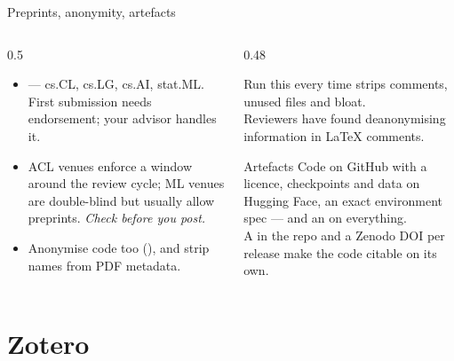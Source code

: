 \documentclass[aspectratio=169,11pt]{beamer}
\begin{document}
\begin{frame}{Preprints, anonymity, artefacts}
\begin{columns}[T]
\begin{column}{0.5\textwidth}
\begin{itemize}
  \item {} --- cs.CL, cs.LG, cs.AI, stat.ML. First submission needs
        endorsement; your advisor handles it.
  \item {} ACL venues enforce a window around the review cycle;
        ML venues are double-blind but usually allow preprints. \emph{Check
        before you post.}
  \item Anonymise code too
        (), and
        strip names from PDF metadata.
\end{itemize}
\end{column}
\begin{column}{0.48\textwidth}
\begin{block}{Run this every time}
\footnotesize
{}
strips comments, unused files and bloat.\\[3pt]
Reviewers have found deanonymising information in LaTeX comments.
\end{block}
\begin{block}{Artefacts}
\footnotesize
Code on GitHub with a licence, checkpoints and data on Hugging Face, an exact
environment spec --- and an  on everything.\\[3pt]
A  in the repo and a Zenodo DOI per release make the code
citable on its own.
\end{block}
\end{column}
\end{columns}
\end{frame}

\section{Zotero}
\end{document}
